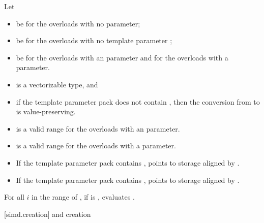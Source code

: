 \begin{itemdescr}
\pnum
Let
\begin{itemize}
 \item
    be  for the
   overloads with no  parameter;
 \item
    be  for the overloads with no
   template parameter ;
 \item
    be  for the overloads with an 
   parameter and  for the overloads with a 
   parameter.
\end{itemize}

\pnum
\mandates
\begin{itemize}
 \item
    is a vectorizable type, and
 \item
   if the template parameter pack  does not contain
   , then the conversion from  to
    is value-preserving.
\end{itemize}

\pnum
\expects
\begin{itemize}
 \item
    is a valid range for the overloads with an
    parameter.
 \item
    is a valid range for the overloads with a 
   parameter.
 \item
   If the template parameter pack  contains
   ,  points to storage
   aligned by .
 \item
   If the template parameter pack  contains
   ,  points to
   storage aligned by .
\end{itemize}

\pnum
\effects
For all $i$ in the range of , if
 is , evaluates
.
\end{itemdescr}

[simd.creation]{ and  creation}

